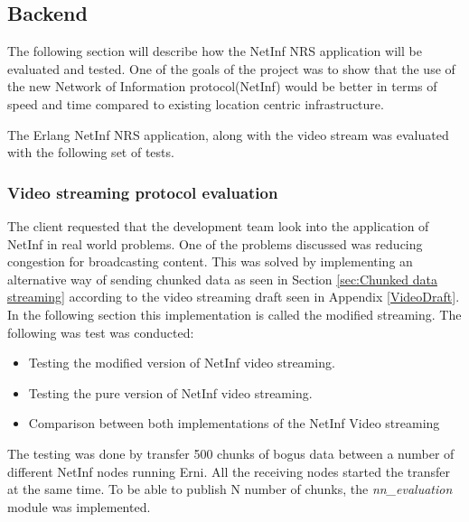 \subsection{Backend}

The following section will describe how the NetInf NRS application will be evaluated and tested. One of the goals of the project was to show that the use of the new Network of Information protocol(NetInf) would be better in terms of speed and time compared to existing location centric infrastructure. 

The Erlang NetInf NRS application, along with the video stream was evaluated with the following set of tests. 


\subsubsection{Video streaming protocol evaluation}
The client requested that the development team look into the application of NetInf in real world problems. One of the problems discussed was reducing congestion for broadcasting content. This was solved by implementing an alternative way of sending chunked data as seen in Section \ref{sec:Chunked data streaming} according to the video streaming draft seen in Appendix \ref{VideoDraft}. In the following section this implementation is called the modified streaming. The following was test was conducted:

\begin{itemize}
\item Testing the modified version of NetInf video streaming. 
\item Testing the pure version of NetInf video streaming.
\item Comparison between both implementations of the NetInf Video streaming
\end{itemize}

The testing was done by transfer 500 chunks of bogus data between a number of different NetInf nodes running Erni. All the receiving nodes started the transfer at the same time. To be able to publish N number of chunks, the \textit{nn\_evaluation} module was implemented.


